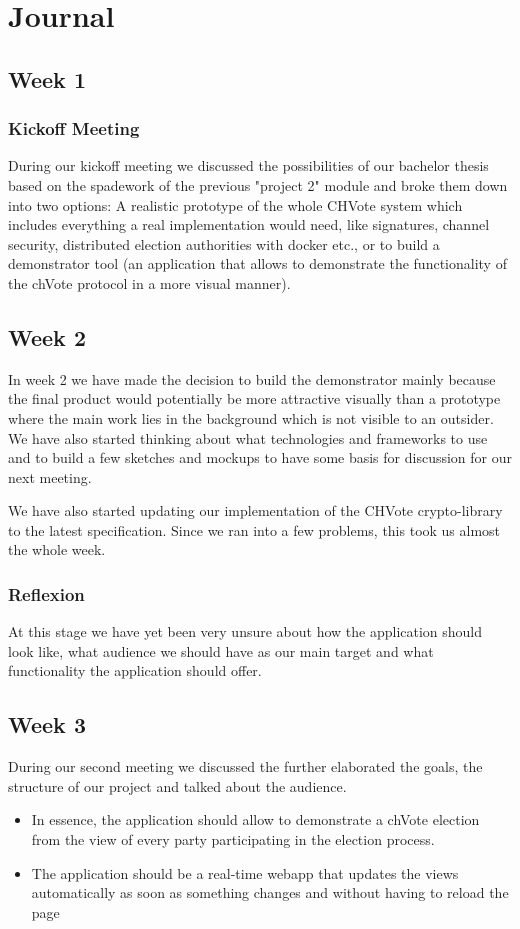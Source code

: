 \chapter{Journal}

\section{Week 1}
\subsection{Kickoff Meeting}
During our kickoff meeting we discussed the possibilities of our bachelor thesis based on the spadework of the previous "project 2" module and broke them down into two options: A realistic prototype of the whole CHVote system which includes everything a real implementation would need, like signatures, channel security, distributed election authorities with docker etc., or to build a demonstrator tool (an application that allows to demonstrate the functionality of the chVote protocol in a more visual manner).

\section{Week 2}
In week 2 we have made the decision to build the demonstrator mainly because the final product would potentially be more attractive visually than a prototype where the main work lies in the background which is not visible to an outsider. We have also started thinking about what technologies and frameworks to use and to build a few sketches and mockups to have some basis for discussion for our next meeting.

We have also started updating our implementation of the CHVote crypto-library to the latest specification. Since we ran into a few problems, this took us almost the whole week.

\subsection{Reflexion}
At this stage we have yet been very unsure about how the application should look like, what audience we should have as our main target and what functionality the application should offer.

\section{Week 3}
During our second meeting we discussed the further elaborated the goals, the structure of our project and talked about the audience.
\begin{itemize}
\item In essence, the application should allow to demonstrate a chVote election from the view of every party participating in the election process.
\item The application should be a real-time webapp that updates the views automatically as soon as something changes and without having to reload the page
\end{itemize}

